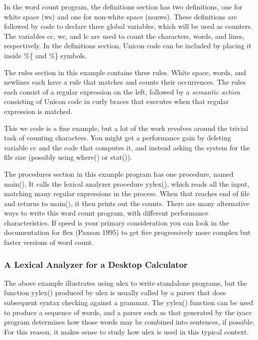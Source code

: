 In the word count program, the definitions section has two definitions,
one for white space (\textsf{ws}) and one for non-white space
(\textsf{nonws}). These definitions are followed by code to declare
three global variables, which will be used as counters. The variables
\textsf{cc}, \textsf{wc}, and \textsf{lc} are used to count the
characters, words, and lines, respectively. In the definitions
section, Unicon code can be included by placing it inside \%\{
and \%\} symbols.

The rules section in this example contains three rules. White space,
words, and newlines each have a rule that matches and counts their
occurrences. The rules each consist of a regular expression on the
left, followed by a {\em semantic action\/} consisting of Unicon code
in curly braces that executes when that regular expression is matched.

This \textsf{wc} code is a fine example, but a lot of the work
revolves around the trivial task of counting characters. You might
get a performance gain by deleting variable cc and the code that
computes it, and instead asking the system for the file size (possibly
using \textsf{where()} or \textsf{stat()}).

The procedures section in this example program has one procedure,
named \textsf{main()}. It calls the lexical analyzer procedure
yylex(), which reads all the input, matching many regular expressions
in the process. When that reaches end of file and returns to main(),
it then prints out the counts. There are many alternative ways to
write this word count program, with different performance
characteristics. If speed is your primary consideration you can look in
the documentation for \textsf{flex} (Paxson 1995) to get five
progressively more complex but faster versions of word count.

\subsubsection{A Lexical Analyzer for a Desktop Calculator}

The above example illustrates using \textsf{ulex} to write standalone
programs, but the function \textsf{yylex()} produced by \textsf{ulex}
is usually called by a parser that does subsequent syntax checking
against a grammar. The \textsf{yylex()} function
can be used to produce a sequence of words, and a parser such as that
generated by the \textsf{iyacc} program determines how those words may
be combined into sentences, if possible. For this reason, it makes
sense to study how \textsf{ulex} is used in this typical context.

